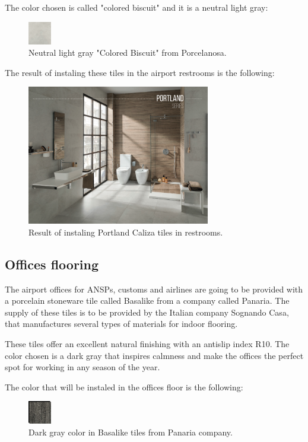 	The color chosen is called "colored biscuit" and it is a neutral light gray:
			\begin{figure}[H]
	\centering
\includegraphics[width=1cm]{./images/Color3}
\caption{Neutral light gray "Colored Biscuit" from Porcelanosa.}
\end{figure}

The result of instaling these tiles in the airport restrooms is the following:

\begin{figure}[H]
	\centering
\includegraphics[width=8cm]{./images/Resultado3}
\caption{Result of instaling Portland Caliza tiles in restrooms.}
\end{figure}
	
		\subsection{Offices flooring}
	The airport offices for ANSPs, customs and airlines are going to be provided with a porcelain stoneware tile called Basalike from a company called Panaria. The supply of these tiles is to be provided by the Italian company Sognando Casa, that manufactures several types of materials for indoor flooring.
	
	These tiles offer an excellent natural finishing with an antislip index R10. The color chosen is a dark gray that inspires calmness and make the offices the perfect spot for working in any season of the year.
	
	The color that will be instaled in the offices floor is the following:
\begin{figure}[H]
\centering
\includegraphics[width=1cm]{./images/Color4}
\caption{Dark gray color in Basalike tiles from Panaria company.}
\end{figure}

